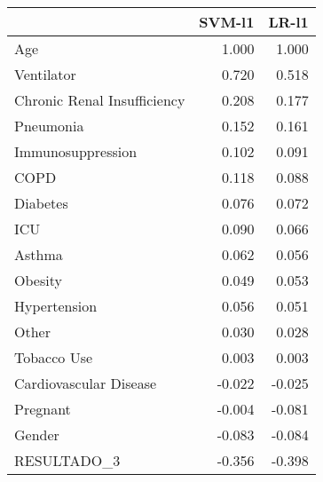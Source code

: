 \begin{tabular}{lrr}
\toprule
{} &  SVM-l1 &  LR-l1 \\
\midrule
Age                         &   1.000 &  1.000 \\
Ventilator                  &   0.720 &  0.518 \\
Chronic Renal Insufficiency &   0.208 &  0.177 \\
Pneumonia                   &   0.152 &  0.161 \\
Immunosuppression           &   0.102 &  0.091 \\
COPD                        &   0.118 &  0.088 \\
Diabetes                    &   0.076 &  0.072 \\
ICU                         &   0.090 &  0.066 \\
Asthma                      &   0.062 &  0.056 \\
Obesity                     &   0.049 &  0.053 \\
Hypertension                &   0.056 &  0.051 \\
Other                       &   0.030 &  0.028 \\
Tobacco Use                 &   0.003 &  0.003 \\
Cardiovascular Disease      &  -0.022 & -0.025 \\
Pregnant                    &  -0.004 & -0.081 \\
Gender                      &  -0.083 & -0.084 \\
RESULTADO\_3                 &  -0.356 & -0.398 \\
\bottomrule
\end{tabular}
